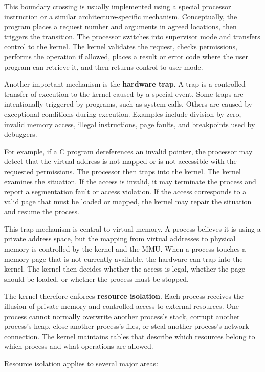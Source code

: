 This boundary crossing is usually implemented using a special processor instruction or a similar architecture-specific mechanism. Conceptually, the program places a request number and arguments in agreed locations, then triggers the transition. The processor switches into supervisor mode and transfers control to the kernel. The kernel validates the request, checks permissions, performs the operation if allowed, places a result or error code where the user program can retrieve it, and then returns control to user mode.

Another important mechanism is the \textbf{hardware trap}. A trap is a controlled transfer of execution to the kernel caused by a special event. Some traps are intentionally triggered by programs, such as system calls. Others are caused by exceptional conditions during execution. Examples include division by zero, invalid memory access, illegal instructions, page faults, and breakpoints used by debuggers.

For example, if a C program dereferences an invalid pointer, the processor may detect that the virtual address is not mapped or is not accessible with the requested permissions. The processor then traps into the kernel. The kernel examines the situation. If the access is invalid, it may terminate the process and report a segmentation fault or access violation. If the access corresponds to a valid page that must be loaded or mapped, the kernel may repair the situation and resume the process.

This trap mechanism is central to virtual memory. A process believes it is using a private address space, but the mapping from virtual addresses to physical memory is controlled by the kernel and the MMU. When a process touches a memory page that is not currently available, the hardware can trap into the kernel. The kernel then decides whether the access is legal, whether the page should be loaded, or whether the process must be stopped.

The kernel therefore enforces \textbf{resource isolation}. Each process receives the illusion of private memory and controlled access to external resources. One process cannot normally overwrite another process's stack, corrupt another process's heap, close another process's files, or steal another process's network connection. The kernel maintains tables that describe which resources belong to which process and what operations are allowed.

Resource isolation applies to several major areas:

